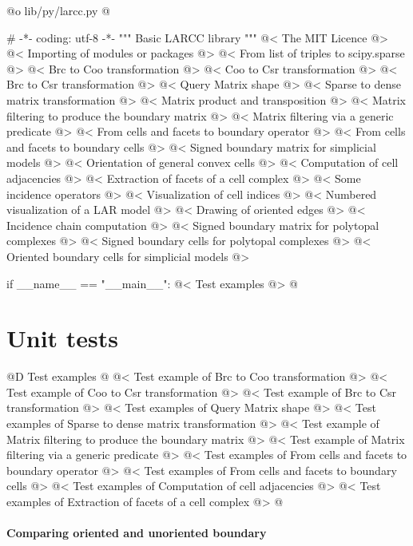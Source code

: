 \documentclass[11pt,oneside]{article}	%
\begin{document}
@o lib/py/larcc.py
@{# -*- coding: utf-8 -*-
""" Basic LARCC library """
@< The MIT Licence @>
@< Importing of modules or packages @>
@< From list of triples to scipy.sparse @>
@< Brc to Coo transformation @>
@< Coo to Csr transformation @>
@< Brc to Csr transformation @>
@< Query Matrix shape @>
@< Sparse to dense matrix transformation @>
@< Matrix product and transposition @>
@< Matrix filtering to produce the boundary matrix @>
@< Matrix filtering via a generic predicate @>
@< From cells and facets to boundary operator @>
@< From cells and facets to boundary cells @>
@< Signed boundary matrix for simplicial models @>
@< Orientation of general convex cells @>
@< Computation of cell adjacencies @>
@< Extraction of facets of a cell complex @>
@< Some incidence operators @>
@< Visualization of cell indices @>
@< Numbered visualization of a LAR model @>
@< Drawing of oriented edges @>
@< Incidence chain computation @>
@< Signed boundary matrix for polytopal complexes @>
@< Signed boundary cells for polytopal complexes @>
@<  Oriented boundary cells for simplicial models @>

if __name__ == "__main__": 
	@< Test examples @>
@}

\section{Unit tests}


@D Test examples
@{
@< Test example of Brc to Coo transformation @>
@< Test example of Coo to Csr transformation @>
@< Test example of Brc to Csr transformation @>
@< Test examples of Query Matrix shape @>
@< Test examples of Sparse to dense matrix transformation @>
@< Test example of Matrix filtering to produce the boundary matrix @>
@< Test example of Matrix filtering via a generic predicate @>
@< Test examples of From cells and facets to boundary operator @>
@< Test examples of From cells and facets to boundary cells @>
@< Test examples of Computation of cell adjacencies @>
@< Test examples of Extraction of facets of a cell complex @>
@}

\paragraph{Comparing oriented and unoriented boundary}
\end{document}
